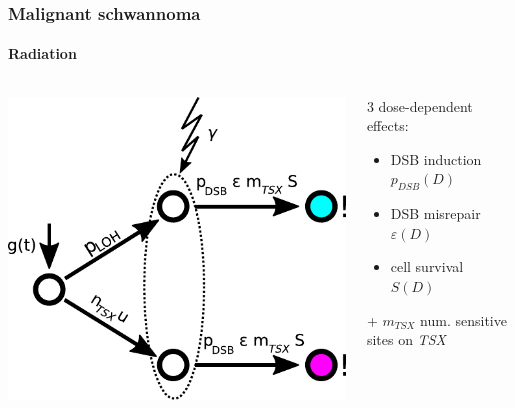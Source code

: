 \documentclass{beamer}
\begin{document}
\begin{frame}
    \frametitle{Malignant schwannoma}
    \framesubtitle{Radiation}

    \begin{columns}
        \begin{column}{0.5\textwidth}
        \includegraphics[width=\textwidth]{figures/radiation-model}
        \end{column}
        \begin{column}{0.5\textwidth}
        3 dose-dependent effects:
        \begin{itemize}
            \item DSB induction $p_{DSB}(D)$
            \item DSB misrepair $\varepsilon(D)$
            \item cell survival $S(D)$
        \end{itemize}

        + $m_{TSX}$ num. sensitive sites on \emph{TSX}
        \end{column}
    \end{columns}
\end{frame}
\end{document}
